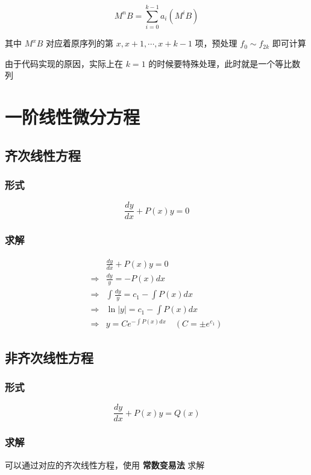 \documentclass[UTF8]{article}
\begin{document}
$$
M^nB=\sum_{i=0}^{k-1}a_i\left(M^{i}B\right)
$$

其中 $M^xB$ 对应着原序列的第 $x,x+1, \cdots, x+k-1$ 项，预处理 $f_0 \sim f_{2k}$ 即可计算

由于代码实现的原因，实际上在 $k=1$ 的时候要特殊处理，此时就是一个等比数列

\section{一阶线性微分方程}

\subsection{齐次线性方程}

\subsubsection{形式}

$$
\frac{dy}{dx}+P(x)y=0
$$

\subsubsection{求解}

$$
\begin{aligned}
& \frac{dy}{dx}+P(x)y=0 \\
\Rightarrow
& \frac{dy}{y}=-P(x)dx \\
\Rightarrow
& \int \frac{dy}{y}=c_1 -\int P(x)dx \\
\Rightarrow
& \ln |y|=c_1- \int P(x)dx \\
\Rightarrow
& y=C e^{-\int P(x)dx} \quad (C=\pm e^{c_1})
\end{aligned}
$$

\subsection{非齐次线性方程}

\subsubsection{形式}

$$
\frac{dy}{dx}+P(x)y=Q(x)
$$

\subsubsection{求解}

可以通过对应的齐次线性方程，使用 \textbf{常数变易法} 求解
\end{document}
